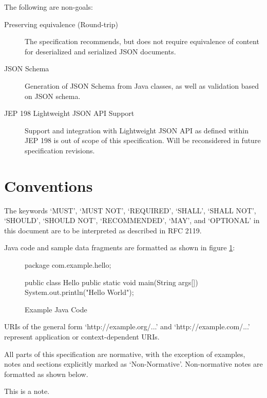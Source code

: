 The following are non-goals:

\begin{description}

\item[Preserving equivalence (Round-trip)] The specification recommends, but does not require equivalence of content for deserialized and serialized JSON documents.

\item[JSON Schema] Generation of JSON Schema from Java classes, as well as validation based on JSON schema.

\item[JEP 198 Lightweight JSON API Support] Support and integration with Lightweight JSON API as defined within JEP 198 is out of scope of this specification. Will be reconsidered in future specification revisions.

\end{description}

\section{Conventions}

The keywords `MUST', `MUST NOT', `REQUIRED', `SHALL', `SHALL NOT', `SHOULD', `SHOULD NOT', `RECOMMENDED', `MAY', and `OPTIONAL' in this document are to be interpreted as described in RFC 2119\cite{rfc2119}. 

Java code and sample data fragments are formatted as shown in figure \ref{ex1}:

\begin{figure}[hbtp]
\caption{Example Java Code}
\label{ex1}
\begin{listing}{1}
package com.example.hello;

public class Hello {
    public static void main(String args[]) {
        System.out.println("Hello World");
    }
}\end{listing}
\end{figure}

URIs of the general form `http://example.org/...' and `http://example.com/...' represent application or context-dependent URIs.

All parts of this specification are normative, with the exception of examples, notes and sections explicitly marked as `Non-Normative'. Non-normative notes are formatted as shown below.

\begin{nnnote*}
This is a note.
\end{nnnote*}

